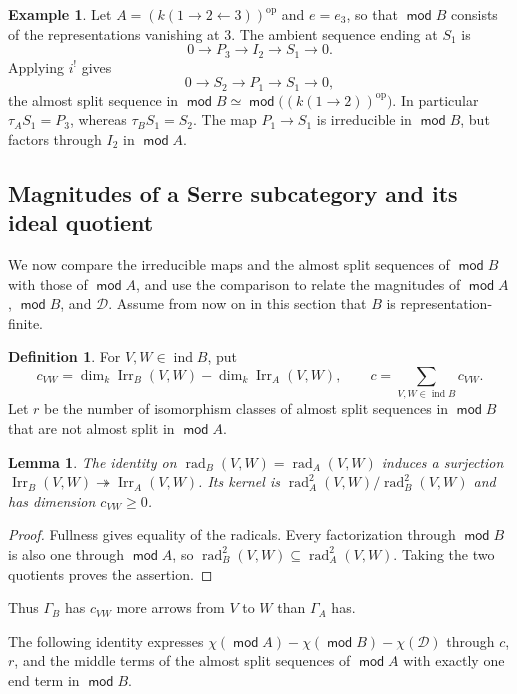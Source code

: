 \documentclass[a4paper,reqno,10pt]{amsart}
\newtheorem{lemma}[theorem]{Lemma}
\theoremstyle{definition}
\newtheorem{definition}[theorem]{Definition}
\newtheorem{example}[theorem]{Example}
\numberwithin{equation}{section}
\DeclareMathOperator{\moduleCategory}{\mathsf{mod}}
\renewcommand{\mod}{\moduleCategory}
\DeclareMathOperator{\ind}{ind}
\DeclareMathOperator{\Irr}{Irr}
\DeclareMathOperator{\rad}{rad}
\newcommand{\op}{\mathrm{op}}
\newcommand{\cD}{\mathcal D}
\begin{document}
\begin{example}\label{ex:fork-restriction}
Let \(A=(k(1\to2\leftarrow3))^{\op}\) and \(e=e_3\), so that \(\mod B\)
consists of the representations vanishing at \(3\). The ambient sequence ending at \(S_1\) is
\[
 0\longrightarrow P_3\longrightarrow I_2\longrightarrow S_1\longrightarrow0.
\]
Applying \(i^!\) gives
\[
 0\longrightarrow S_2\longrightarrow P_1\longrightarrow S_1\longrightarrow0,
\]
the almost split sequence in \(\mod B\simeq\mod\bigl((k(1\to2))^{\op}\bigr)\).
In particular \(\tau_A S_1=P_3\), whereas \(\tau_BS_1=S_2\). The map
\(P_1\to S_1\) is irreducible in \(\mod B\), but factors through \(I_2\)
in \(\mod A\).
\end{example}

\subsection{Magnitudes of a Serre subcategory and its ideal quotient}\label{subsec:new-counts}
We now compare the irreducible maps and the almost split sequences of
\(\mod B\) with those of \(\mod A\), and use the comparison to relate
the magnitudes of \(\mod A\), \(\mod B\), and \(\cD\).
Assume from now on in this section that \(B\) is representation-finite.

\begin{definition}\label{def:new-counts}
For \(V,W\in\ind B\), put
\[
 c_{VW}=\dim_k\Irr_B(V,W)-\dim_k\Irr_A(V,W),\qquad
 c=\sum_{V,W\in\ind B}c_{VW}.
\]
Let \(r\) be the number of isomorphism classes of almost split sequences
in \(\mod B\) that are not almost split in \(\mod A\).
\end{definition}

\begin{lemma}\label{lem:new-arrows}
The identity on \(\rad_B(V,W)=\rad_A(V,W)\) induces a surjection
\(\Irr_B(V,W)\twoheadrightarrow\Irr_A(V,W)\).
Its kernel is \(\rad_A^2(V,W)/\rad_B^2(V,W)\) and has dimension
\(c_{VW}\geq0\).
\end{lemma}
\begin{proof}
Fullness gives equality of the radicals. Every factorization through
\(\mod B\) is also one through \(\mod A\), so
\(\rad_B^2(V,W)\subseteq\rad_A^2(V,W)\). Taking the two quotients
proves the assertion.
\end{proof}
Thus \(\Gamma_B\) has \(c_{VW}\) more arrows from \(V\) to \(W\) than
\(\Gamma_A\) has.

The following identity expresses
\(\chi(\mod A)-\chi(\mod B)-\chi(\cD)\) through \(c\), \(r\), and the middle terms of the almost split sequences of
\(\mod A\) with exactly one end term in \(\mod B\).
\end{document}

